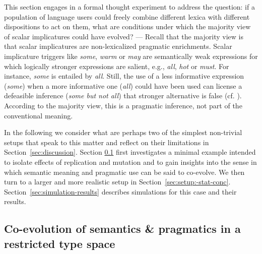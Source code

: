 \documentclass[a4paper, 11pt]{article}
\theoremstyle{Satz}
\begin{document}
This section engages in a formal thought experiment to address the question: if a population of
language users could freely combine different lexica with different dispositions to act on
them, what are conditions under which the majority view of scalar implicatures could have
evolved? --- Recall that the majority view is that scalar implicatures are non-lexicalized
pragmatic enrichments. Scalar implicature triggers like \emph{some}, \emph{warm} or \emph{may}
are semantically weak expressions for which logically stronger expressions are salient, e.g.,
\emph{all}, \emph{hot} or \emph{must}. For instance, {\em some} is entailed by {\em
  all}. Still, the use of a less informative expression (\emph{some}) when a more informative
one (\emph{all}) could have been used can license a defeasible inference (\emph{some but not
  all}) that stronger alternative is false (cf. \citealt{horn:1972,gazdar:1979}). According to
the majority view, this is a pragmatic inference, not part of the conventional meaning.

In the following we consider what are perhaps two of the simplest non-trivial setups that speak
to this matter and reflect on their limitations in Section~\ref{sec:discussion}. Section
\ref{subsec:example} first investigates a minimal example intended to isolate effects of
replication and mutation and to gain insights into the sense in which semantic meaning and
pragmatic use can be said to co-evolve. We then turn to a larger and more realistic setup in
Section~\ref{sec:setup:-stat-conc}. Section~\ref{sec:simulation-results} describes simulations
for this case and their results.


\subsection{Co-evolution of semantics \& pragmatics in a restricted type space}
\label{subsec:example}
\end{document}

